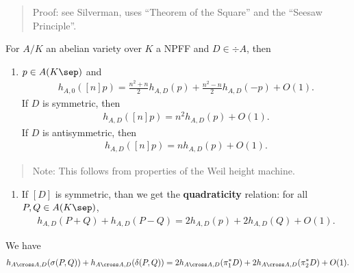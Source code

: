 \begin{quote}
Proof: see Silverman, uses ``Theorem of the Square'' and the ``Seesaw
Principle''.
\end{quote}

\begin{description}
\tightlist
\item[Corollary]
For \(A/K\) an abelian variety over \(K\) a NPFF and \(D\in \div A\),
then
\end{description}

\begin{enumerate}
\def\labelenumi{\alph{enumi}.}
\tightlist
\item
  \(p\in A(K\sep)\) and
  \begin{align*}
    h_{A, 0}([n]p) = \frac{n^2 + n}{2} h_{A, D}(p) + \frac{n^2 - n}{2} h_{A, D}(-p) + O(1)
    .\end{align*} If \(D\) is symmetric, then
  \begin{align*}
      h_{A, D}([n]p) = n^2 h_{A, D}(p) + O(1)
      .\end{align*} If \(D\) is antisymmetric, then
  \begin{align*}
      h_{A, D}([n]p) = nh_{A, D}(p) + O(1)
      .\end{align*}
\end{enumerate}

\begin{quote}
Note: This follows from properties of the Weil height machine.
\end{quote}

\begin{enumerate}
\def\labelenumi{\alph{enumi}.}
\setcounter{enumi}{1}
\tightlist
\item
  If \([D]\) is symmetric, than we get the \textbf{quadraticity}
  relation: for all \(P, Q \in A(K\sep)\),
  \begin{align*}
    h_{A, D}(P+Q) + h_{A, D}(P-Q) = 2h_{A, D}(p) + 2h_{A, D}(Q) + O(1)
    .\end{align*}
\end{enumerate}

\begin{description}
\tightlist
\item[Proof]
We have
\begin{align*}
  h_{A\cross A, D}(\sigma(P, Q)) + h_{A\cross A, D}(\delta(P,Q)) = 2h_{A\cross A, D}(\pi_1^* D) + 2h_{A\cross A, D}(\pi_2^* D) + O(1)
  .\end{align*}
\end{description}

